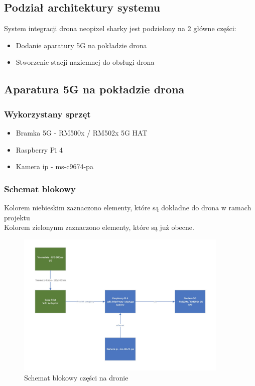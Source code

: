 \documentclass{article}
\begin{document}
\subsection{Podział architektury systemu}
System integracji drona neopixel sharky jest podzielony na 2 główne części:
\begin{itemize}
    \item Dodanie aparatury 5G na pokładzie drona
    \item Stworzenie stacji naziemnej do obsługi drona
\end{itemize}

\subsection{Aparatura 5G na pokładzie drona}
\subsubsection{Wykorzystany sprzęt}

\begin{itemize}
    \item Bramka 5G - RM500x / RM502x 5G HAT
    \item Raspberry Pi 4
    \item Kamera ip - ms-c9674-pa
\end{itemize}

\subsubsection{Schemat blokowy}
Kolorem niebieskim zaznaczono elementy, które są dokładne do drona w ramach projektu\\
Kolorem zielonynm zaznaczono elementy, które są już obecne.

\begin{figure}[H]
    \centering
    \includegraphics[width=0.9\textwidth]{nadronie.jpg}
    \caption{Schemat blokowy części na dronie}
\end{figure}
\end{document}
